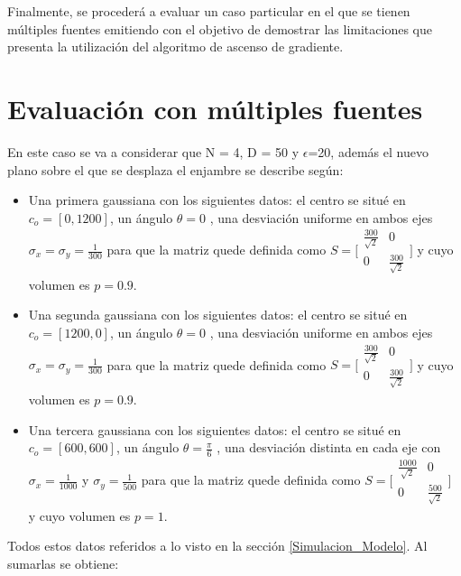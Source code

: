 Finalmente, se procederá a evaluar un caso particular en el que se tienen múltiples fuentes emitiendo con el objetivo de demostrar las limitaciones que presenta la utilización del algoritmo de ascenso de gradiente.

\section{Evaluación con múltiples fuentes}

En este caso se va a considerar que N = 4, D = 50 y $\epsilon$=20, además el nuevo plano sobre el que se desplaza el enjambre se describe según:

\begin{itemize}
	\item Una primera gaussiana con los siguientes datos: el centro se situé en $c_{o}=[0,1200]$, un ángulo $\theta=0$ , una desviación uniforme en ambos ejes $\sigma_{x}=\sigma_{y}=\frac{1}{300}$ para que la matriz quede definida como $S = \bigl[\begin{smallmatrix}\frac{300}{\sqrt{2}} & 0\\ 0 & \frac{300}{\sqrt{2}}\end{smallmatrix}\bigr]$  y cuyo volumen es $p = 0.9$. 
	\item Una segunda gaussiana con los siguientes datos: el centro se situé en $c_{o}=[1200,0]$, un ángulo $\theta=0$ , una desviación uniforme en ambos ejes $\sigma_{x}=\sigma_{y}=\frac{1}{300}$ para que la matriz quede definida como $S = \bigl[\begin{smallmatrix}\frac{300}{\sqrt{2}} & 0\\ 0 & \frac{300}{\sqrt{2}}\end{smallmatrix}\bigr]$  y cuyo volumen es $p = 0.9$.
	\item Una tercera gaussiana con los siguientes datos: el centro se situé en $c_{o}=[600,600]$, un ángulo $\theta=\frac{\pi}{6}$ , una desviación distinta en cada eje con $\sigma_{x}=\frac{1}{1000}$ y $\sigma_{y}=\frac{1}{500}$  para que la matriz quede definida como $S = \bigl[\begin{smallmatrix}\frac{1000}{\sqrt{2}} & 0\\ 0 & \frac{500}{\sqrt{2}}\end{smallmatrix}\bigr]$ y cuyo volumen es $p = 1$. 
\end{itemize}

Todos estos datos referidos a lo visto en la sección \ref{Simulacion_Modelo}. Al sumarlas se obtiene:

